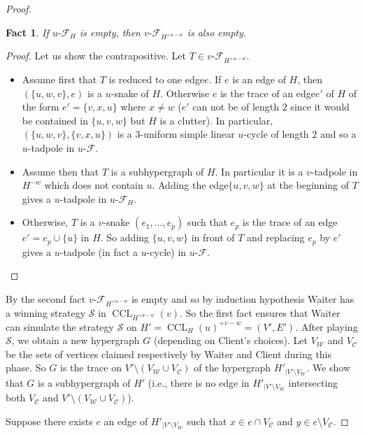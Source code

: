 \documentclass{article}
\newcommand{\strat}{\mathcal{S}}
\newcommand{\hedge}{edge\xspace}
\DeclareMathOperator{\CCL}{CCL}
\newcommand{\Client}{\mathcal{C}}
\newcommand{\Waiter}{\mathcal{W}}
\newcommand{\uCwin}{u\text{-}\mathcal{F}}
\newcommand{\vCwin}{v\text{-}\mathcal{F}}
\newtheorem{fact}[theorem]{Fact}
\begin{document}
\begin{proof}
	\begin{fact}
		If \(\uCwin_{H}\) is empty, then \(\vCwin_{H^{+u-w}}\) is also empty.
	\end{fact}
	\begin{proof}
		Let us show the contrapositive. Let \(T \in \vCwin_{H^{+u-w}}\). 
		\begin{itemize}
			\item Assume first that \(T\) is reduced to one \hedge \(e\). If \(e\) is an \hedge of \(H\), then \((\{u,w,v\},e)\) is a \(u\)-snake of \(H\). Otherwise \(e\) is the trace of an \hedge \(e'\) of \(H\) of the form \(e' = \{v,x,u\}\) where \(x \neq w\) (\(e'\) can not be of length \(2\) since it would be contained in \(\{u,v,w\}\) but \(H\) is a clutter). In particular, \((\{u,w,v\},\{v,x,u\})\) is a \(3\)-uniform simple linear \(u\)-cycle of length \(2\) and so a \(u\)-tadpole in \(\uCwin\). 
			\item Assume then that \(T\) is a subhypergraph of \(H\). In particular it is a \(v\)-tadpole in \(H^{-w}\) which does not contain \(u\). Adding the \hedge \(\{u,v,w\}\) at the beginning of \(T\) gives a \(u\)-tadpole in \(\uCwin_H\).  
			\item Otherwise, \(T\) is a \(v\)-snake \((e_1,\ldots,e_{p})\) such that \(e_p\) is the trace of an \hedge \(e'= e_p \cup \{u\}\) in \(H\). 
So adding \(\{u,v,w\}\) in front of \(T\) and replacing \(e_p\) by \(e'\) gives a \(u\)-tadpole (in fact a \(u\)-cycle) in \(\uCwin\). \qedhere
		\end{itemize}
	\end{proof}

By the second fact \(\vCwin_{H^{+u-w}}\) is empty and so by induction hypothesis Waiter has a winning strategy \(\strat\) in \(\CCL_{H^{+u-w}}(v)\). 
So the first fact ensures that Waiter can simulate the strategy \(\strat\) on \(H'= \CCL_{H}(u)^{+v-w} = (V',E')\). 
	After playing \(\strat\), we obtain a new hypergraph \(G\)  (depending on Client's choices). Let \(V_{\Waiter}\) and \(V_{\Client}\) be the sets of vertices claimed respectively by Waiter and Client during this phase. So \(G\) is the trace on \(V' \setminus (V_{\Waiter} \cup V_{\Client})\) of the hypergraph \(H'_{| V' \setminus V_{\Waiter}}\). We show that \(G\) is a subhypergraph of \(H'\) (i.e., there is no \hedge in \(H'_{| V' \setminus V_{\Waiter}}\) intersecting both \(V_{\Client}\) and \(V' \setminus (V_{\Waiter} \cup V_{\Client})\)).


	Suppose there exists \(e\) an \hedge of \(H'_{| V' \setminus V_{\Waiter}}\) such that \(x \in e \cap V_{\Client}\) and \(y \in e \setminus V_{\Client}\).
	

\end{proof}
\end{document}
